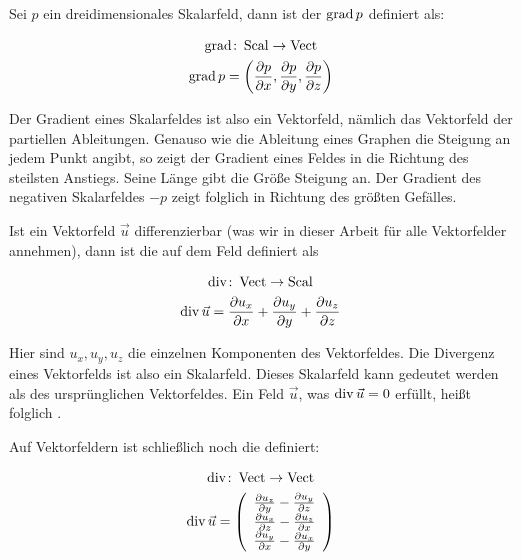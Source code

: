 Sei $p$ ein dreidimensionales Skalarfeld, dann ist der 
$\operatorname*{grad} p$ definiert als:

\begin{gather}
\operatorname*{grad} \colon \operatorname*{Scal} \to \operatorname*{Vect} \\
\operatorname*{grad} p
=
\left( \frac{\partial p}{\partial x},\frac{\partial p}{\partial y},\frac{\partial p}{\partial z} \right)
\end{gather}

Der Gradient eines Skalarfeldes ist also ein Vektorfeld, nämlich das Vektorfeld
der partiellen Ableitungen. Genauso wie die Ableitung eines Graphen die Steigung
an jedem Punkt angibt, so zeigt der Gradient eines Feldes in die Richtung des
steilsten Anstiegs. Seine Länge gibt die Größe Steigung an. Der Gradient des
negativen Skalarfeldes $-p$ zeigt folglich in Richtung des größten Gefälles.

Ist ein Vektorfeld $\vec{u}$ differenzierbar (was wir in dieser Arbeit für alle
Vektorfelder annehmen), dann ist die  auf dem
Feld definiert als

\begin{gather}
\operatorname*{div} \colon \operatorname*{Vect} \to \operatorname*{Scal} \\
\operatorname*{div} \vec{u}
=
\frac{\partial u_x}{\partial x} +
\frac{\partial u_y}{\partial y} +
\frac{\partial u_z}{\partial z}
\end{gather}

Hier sind $u_x,u_y,u_z$ die einzelnen Komponenten des Vektorfeldes. Die
Divergenz eines Vektorfelds ist also ein Skalarfeld. Dieses Skalarfeld kann
gedeutet werden als  des ursprünglichen
Vektorfeldes. Ein Feld $\vec{u}$, was $\operatorname*{div} \vec{u}=0$ erfüllt, heißt folglich
.

Auf Vektorfeldern ist schließlich noch die  definiert:

\begin{gather}
\operatorname*{div} \colon \operatorname*{Vect} \to \operatorname*{Vect} \\
\operatorname*{div} \vec{u}
=
\left(
	\begin{array}{c}
		\frac{\partial u_z}{\partial y} - \frac{\partial u_y}{\partial z} \\
		\frac{\partial u_x}{\partial z} - \frac{\partial u_z}{\partial x} \\
		\frac{\partial u_y}{\partial x} - \frac{\partial u_x}{\partial y}
	\end{array}
\right)
\end{gather}

